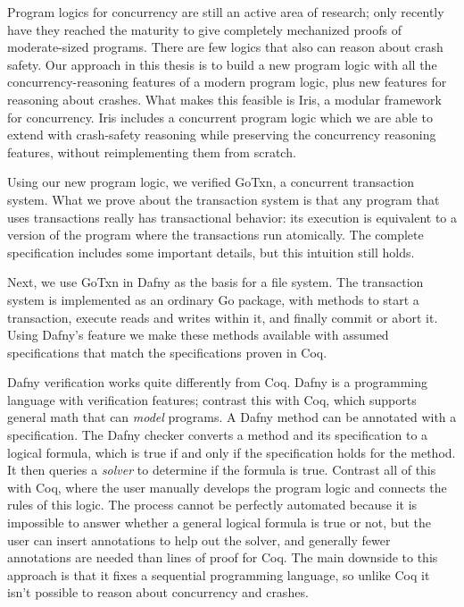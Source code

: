 Program logics for concurrency are still an active area of research; only
recently have they reached the maturity to give completely mechanized proofs of
moderate-sized programs. There are few logics that also can reason about crash
safety. Our approach in this thesis is to build a new program logic with all the
concurrency-reasoning features of a modern program logic, plus new features for
reasoning about crashes. What makes this feasible is Iris, a modular framework
for concurrency. Iris includes a concurrent program logic which we are able to
extend with crash-safety reasoning while preserving the concurrency reasoning
features, without reimplementing them from scratch.

Using our new program logic, we verified GoTxn, a concurrent transaction system.
What we prove about the transaction system is that any program that uses
transactions really has transactional behavior: its execution is equivalent to a
version of the program where the transactions run atomically. The complete
specification includes some important details, but this intuition still holds.

Next, we use GoTxn in Dafny as the basis for a file system.
The transaction system is implemented as an ordinary Go package, with methods to
start a transaction, execute reads and writes within it, and finally commit or
abort it. Using Dafny's  feature we make these methods available with
assumed specifications that match the specifications proven in Coq.

Dafny verification works quite differently from Coq. Dafny is a programming
language with verification features; contrast this with Coq, which supports
general math that can \emph{model} programs. A Dafny method can be annotated
with a specification. The Dafny checker converts a method and its specification
to a logical formula, which is true if and only if the specification holds for
the method. It then queries a \emph{solver} to determine if the formula is true.
Contrast all of this with Coq, where the user manually develops the program
logic and connects the rules of this logic. The process cannot be perfectly
automated because it is impossible to answer whether a general logical formula
is true or not, but the user can insert annotations to help out the solver, and
generally fewer annotations are needed than lines of proof for Coq. The main
downside to this approach is that it fixes a sequential programming language, so
unlike Coq it isn't possible to reason about concurrency and crashes.

